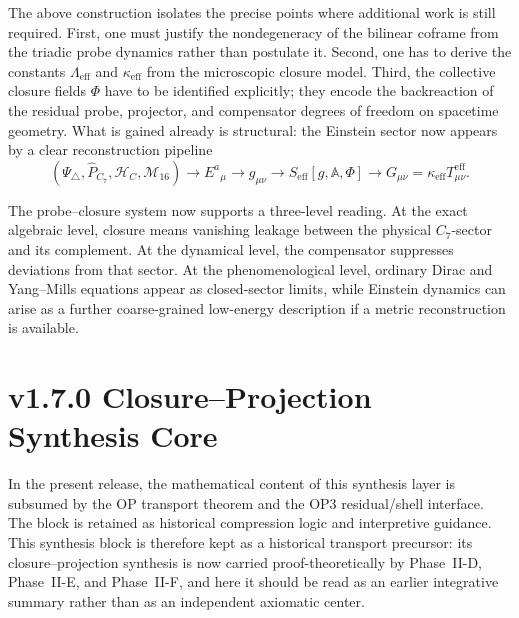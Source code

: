 \begin{remark}
The above construction isolates the precise points where additional work is
still required.
First, one must justify the nondegeneracy of the bilinear coframe from the
triadic probe dynamics rather than postulate it.
Second, one has to derive the constants $\Lambda_{\mathrm{eff}}$ and
$\kappa_{\mathrm{eff}}$ from the microscopic closure model.
Third, the collective closure fields $\Phi$ have to be identified explicitly;
they encode the backreaction of the residual probe, projector, and compensator
degrees of freedom on spacetime geometry.
What is gained already is structural: the Einstein sector now appears by a
clear reconstruction pipeline
\[
  (\Psi_\triangle,\hat P_{C_7},\mathcal H_C,\mathcal M_{16})
  \longrightarrow E^a{}_{\mu}
  \longrightarrow g_{\mu\nu}
  \longrightarrow S_{\mathrm{eff}}[g,\mathbb A,\Phi]
  \longrightarrow G_{\mu\nu}=\kappa_{\mathrm{eff}}T_{\mu\nu}^{\mathrm{eff}}.
\]
\end{remark}

\begin{remark}
The probe--closure system now supports a three-level reading.
At the exact algebraic level, closure means vanishing leakage between the
physical $C_7$-sector and its complement.
At the dynamical level, the compensator suppresses deviations from that
sector.
At the phenomenological level, ordinary Dirac and Yang--Mills equations
appear as closed-sector limits, while Einstein dynamics can arise as a
further coarse-grained low-energy description if a metric reconstruction is
available.
\end{remark}





\section*{v1.7.0 Closure--Projection Synthesis Core}

\begin{remark}
\label{rem:normalization-note-v170}
In the present release, the mathematical content of this synthesis layer is subsumed by the OP transport theorem and the OP3 residual/shell interface. The block is retained as historical compression logic and interpretive guidance. This synthesis block is therefore kept as a historical transport precursor: its closure--projection synthesis is now carried proof-theoretically by Phase~II-D, Phase~II-E, and Phase~II-F, and here it should be read as an earlier integrative summary rather than as an independent axiomatic center.
\end{remark}

